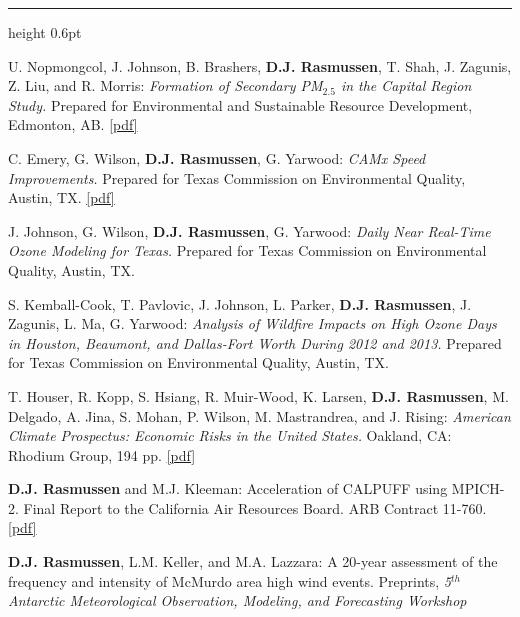 \documentclass[10.5pt]{article}
\newcommand{\cvsection}[1]{%
  \par\addvspace{12pt}\pagebreak[3]%
  {\sffamily\bfseries\small\textls[80]{\MakeUppercase{#1}}}%
  \par\vspace{2pt}%
  {\color{rulegray}\hrule height 0.6pt}%
  \vspace{5pt}\nopagebreak}
\renewcommand{\section}[1]{\cvsection{#1}}
\newcommand{\yr}[1]{{\sffamily\bfseries #1}}
\begin{document}
\section{Research Reports}
\begin{entries}
\item[\yr{2015}] U. Nopmongcol, J. Johnson, B. Brashers, \textbf{D.J. Rasmussen}, T. Shah, J. Zagunis, Z. Liu, and R. Morris: \emph{Formation of Secondary PM$_{2.5}$ in the Capital Region Study.} Prepared for Environmental and Sustainable Resource Development, Edmonton, AB. \href{https://open.alberta.ca/dataset/bba204ba-c516-4a96-9025-0420fc18f401/resource/e111dd78-8c2f-400b-b048-de152a279f8d/download/2015-FormationSecPM2.5CapitalReg-Report-2015.pdf}{[pdf]}
\item[\yr{2015}] C. Emery, G. Wilson, \textbf{D.J. Rasmussen}, G. Yarwood: \emph{CAMx Speed Improvements.} Prepared for Texas Commission on Environmental Quality, Austin, TX. \href{https://wayback.archive-it.org/414/20210529064701/https://www.tceq.texas.gov/assets/public/implementation/air/am/contracts/reports/pm/5821550417FY1535-20150731-environ-camx_speed_improvement.pdf}{[pdf]}
\item[\yr{2015}] J. Johnson, G. Wilson, \textbf{D.J. Rasmussen}, G. Yarwood: \emph{Daily Near Real-Time Ozone Modeling for Texas.} Prepared for Texas Commission on Environmental Quality, Austin, TX.
\item[\yr{2014}] S. Kemball-Cook, T. Pavlovic, J. Johnson, L. Parker, \textbf{D.J. Rasmussen}, J. Zagunis, L. Ma, G. Yarwood: \emph{Analysis of Wildfire Impacts on High Ozone Days in Houston, Beaumont, and Dallas-Fort Worth During 2012 and 2013.} Prepared for Texas Commission on Environmental Quality, Austin, TX.
\item[\yr{2014}] T. Houser, R. Kopp, S. Hsiang, R. Muir-Wood, K. Larsen, \textbf{D.J. Rasmussen}, M. Delgado, A. Jina, S. Mohan, P. Wilson, M. Mastrandrea, and J. Rising: \emph{American Climate Prospectus: Economic Risks in the United States.} Oakland, CA: Rhodium Group, 194 pp. \href{https://impactlab.org/wp-content/uploads/2017/10/AmericanClimateProspectus_v1.2.pdf}{[pdf]}
\item[\yr{2012}] \textbf{D.J. Rasmussen} and M.J. Kleeman: Acceleration of CALPUFF using MPICH-2. Final Report to the California Air Resources Board. ARB Contract 11-760. \href{https://djrasmussen.co/assets/papers/parallel_CALPUFF_FINALreport_CARB.pdf}{[pdf]}
\item[\yr{2010}] \textbf{D.J. Rasmussen}, L.M. Keller, and M.A. Lazzara: A 20-year assessment of the frequency and intensity of McMurdo area high wind events. Preprints, \emph{5$^{th}$ Antarctic Meteorological Observation, Modeling, and Forecasting Workshop}
\end{entries}
\end{document}
